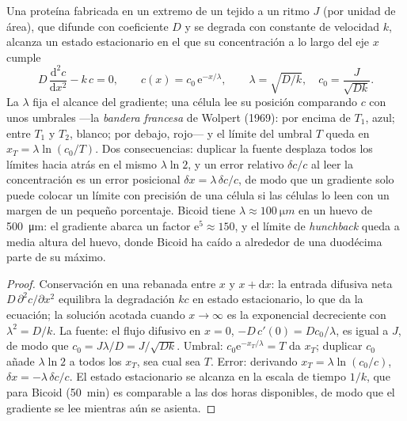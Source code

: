 \begin{theorem}\label{thm:b3:developmental-genetics:gradient}
Una proteína fabricada en un extremo de un tejido a un ritmo $J$ (por
unidad de área), que difunde con coeficiente $D$ y se degrada con
constante de velocidad $k$, alcanza un estado estacionario en el que su
concentración a lo largo del eje $x$ cumple
\[
D\,\frac{\mathrm{d}^{2}c}{\mathrm{d}x^{2}} - k\,c = 0,
\qquad c(x) = c_{0}\,\mathrm{e}^{-x/\lambda}, \qquad \lambda = \sqrt{D/k},
\quad c_{0} = \frac{J}{\sqrt{Dk}} .
\]
La \emph{} $\lambda$ fija el alcance del
gradiente; una célula lee su posición comparando $c$ con unos umbrales
---la \emph{bandera francesa} de Wolpert (1969): por encima de $T_{1}$,
azul; entre $T_{1}$ y $T_{2}$, blanco; por debajo, rojo--- y el límite
del umbral $T$ queda en $x_{T} = \lambda\ln(c_{0}/T)$. Dos
consecuencias: duplicar la fuente desplaza todos los límites hacia
atrás en el mismo $\lambda\ln 2$, y un error relativo $\delta c/c$ al
leer la concentración es un error posicional
$\delta x = \lambda\,\delta c/c$, de modo que un gradiente solo puede
colocar un límite con precisión de una célula si las células lo leen
con un margen de un pequeño porcentaje. Bicoid tiene
$\lambda \approx \qty{100}{\micro m}$ en un huevo de
\qty{500}{\micro m}: el gradiente abarca un factor $\mathrm{e}^{5}
\approx 150$, y el límite de \emph{hunchback} queda a media altura del
huevo, donde Bicoid ha caído a alrededor de una duodécima parte de su
máximo.
\end{theorem}
\begin{proof}
Conservación en una rebanada entre $x$ y $x + \mathrm{d}x$: la entrada
difusiva neta $D\,\partial^{2}c/\partial x^{2}$ equilibra la
degradación $kc$ en estado estacionario, lo que da la ecuación; la
solución acotada cuando $x \to \infty$ es la exponencial decreciente
con $\lambda^{2} = D/k$. La fuente: el flujo difusivo en $x = 0$, $-D\,
c'(0) = Dc_{0}/\lambda$, es igual a $J$, de modo que $c_{0} = J\lambda/D =
J/\sqrt{Dk}$. Umbral: $c_{0}\mathrm{e}^{-x_{T}/\lambda} = T$ da
$x_{T}$; duplicar $c_{0}$ añade $\lambda\ln 2$ a todos los $x_{T}$, sea
cual sea $T$. Error: derivando $x_{T} = \lambda\ln(c_{0}/c)$,
$\delta x = -\lambda\,\delta c/c$. El estado estacionario se alcanza en
la escala de tiempo $1/k$, que para Bicoid (\qty{50}{min}) es
comparable a las dos horas disponibles, de modo que el gradiente se lee
mientras aún se asienta.
\end{proof}


